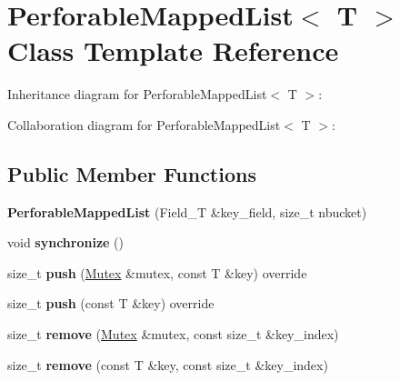 \hypertarget{classPerforableMappedList}{}\section{Perforable\+Mapped\+List$<$ T $>$ Class Template Reference}
\label{classPerforableMappedList}


Inheritance diagram for Perforable\+Mapped\+List$<$ T $>$\+:


Collaboration diagram for Perforable\+Mapped\+List$<$ T $>$\+:
\subsection*{Public Member Functions}
\begin{DoxyCompactItemize}
\item 
{\bfseries Perforable\+Mapped\+List} (Field\+\_\+T \&key\+\_\+field, size\+\_\+t nbucket)\hypertarget{classPerforableMappedList_a2762d4a481b3e97c588535f0ee90f2f6}{}\label{classPerforableMappedList_a2762d4a481b3e97c588535f0ee90f2f6}

\item 
void {\bfseries synchronize} ()\hypertarget{classPerforableMappedList_afd829a31883c89c933c087f2aedd8e76}{}\label{classPerforableMappedList_afd829a31883c89c933c087f2aedd8e76}

\item 
size\+\_\+t {\bfseries push} (\hyperlink{classMutex}{Mutex} \&mutex, const T \&key) override\hypertarget{classPerforableMappedList_a3ad479d83d73c27167e86c49bda6e097}{}\label{classPerforableMappedList_a3ad479d83d73c27167e86c49bda6e097}

\item 
size\+\_\+t {\bfseries push} (const T \&key) override\hypertarget{classPerforableMappedList_a239248b109653d69e7674783f3ab7088}{}\label{classPerforableMappedList_a239248b109653d69e7674783f3ab7088}

\item 
size\+\_\+t {\bfseries remove} (\hyperlink{classMutex}{Mutex} \&mutex, const size\+\_\+t \&key\+\_\+index)\hypertarget{classPerforableMappedList_a59fe65c19b2e25b8952e7251f8d53933}{}\label{classPerforableMappedList_a59fe65c19b2e25b8952e7251f8d53933}

\item 
size\+\_\+t {\bfseries remove} (const T \&key, const size\+\_\+t \&key\+\_\+index)\hypertarget{classPerforableMappedList_a7c11ca2e3696844922055720e4fbb51a}{}\label{classPerforableMappedList_a7c11ca2e3696844922055720e4fbb51a}


\end{DoxyCompactItemize}

